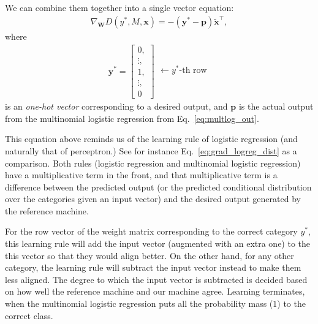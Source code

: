 \documentclass{report}
\newcommand{\vect}[1]{\mathbf{#1}}
\newcommand{\matr}[1]{\mathbf{#1}}
\newcommand{\vx}[0]{\vect{x}}
\newcommand{\vp}[0]{\vect{p}}
\newcommand{\vy}[0]{\vect{y}}
\newcommand{\mW}[0]{\matr{W}}
\begin{document}
We can combine them together into a single vector equation:
\begin{align*}
\nabla_{\mW} D(y^*, M, \vx) =
    -
    \left( 
        \vy^* - \vp
    \right) \tilde{\vx}^\top,
\end{align*}
where 
\begin{align}
    \label{eq:onehot}
    \vy^* = 
    \left[ 
        \begin{array}{c}
            0, \\
            \vdots, \\
            1, \\
            \vdots, \\
            0
        \end{array}
    \right]
    \begin{array}{c}
         \\
         \\
         \leftarrow y^*\text{-th row} \\
         \\
         \\
    \end{array}
\end{align}
is an {\it one-hot vector} corresponding to a desired output, and $\vp$ is the
actual output from the multinomial logistic regression from
Eq.~\eqref{eq:multlog_out}.

This equation above reminds us of the learning rule of logistic regression (and
naturally that of perceptron.) See for instance Eq.~\eqref{eq:grad_logreg_dist}
as a comparison. Both rules (logistic regression and multinomial logistic
regression) have a multiplicative term in the front, and that multiplicative
term is a difference between the predicted output (or the predicted conditional
distribution over the categories given an input vector) and the desired output
generated by the reference machine.

For the row vector of the weight matrix corresponding to the correct category
$y^*$, this learning rule will add the input vector (augmented with an extra
one) to the this vector so that they would align better. On the other hand, for
any other category, the learning rule will subtract the input vector instead to
make them less aligned. The degree to which the input vector is subtracted is
decided based on how well the reference machine and our machine agree.  Learning
terminates, when the multinomial logistic regression puts all the probability
mass ($1$) to the correct class. 
\end{document}
